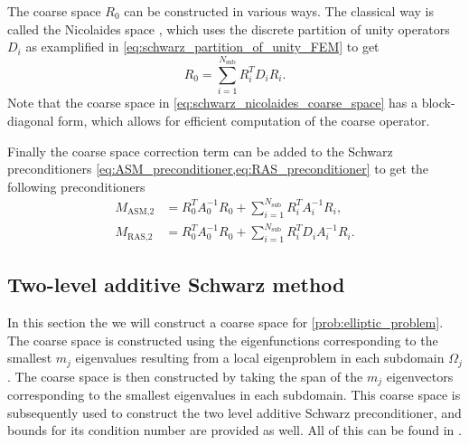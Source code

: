 The coarse space $R_0$ can be constructed in various ways. The classical way is called the Nicolaides space \cite[Section 4.2]{schwarz_methods_Dolean_2015}, which uses the discrete partition of unity operators $D_i$ as examplified in \cref{eq:schwarz_partition_of_unity_FEM} to get
\begin{equation}
  R_0 = \sum_{i=1}^{N_{\text{sub}}} R_i^T D_i R_i.
  \label{eq:schwarz_nicolaides_coarse_space}
\end{equation}
Note that the coarse space in \cref{eq:schwarz_nicolaides_coarse_space} has a block-diagonal form, which allows for efficient computation of the coarse operator.

Finally the coarse space correction term can be added to the Schwarz preconditioners \cref{eq:ASM_preconditioner,eq:RAS_preconditioner} to get the following preconditioners
\begin{subequations}
  \begin{align}
    M_{\text{ASM,2}} & = R_0^T A_0^{-1} R_0 + \sum_{i=1}^{N_{\text{sub}}} R_i^T A_i^{-1} R_i , \label{eq:ASM_preconditioner_coarse}    \\
    M_{\text{RAS,2}} & = R_0^T A_0^{-1} R_0 + \sum_{i=1}^{N_{\text{sub}}} R_i^T D_i A_i^{-1} R_i \label{eq:RAS_preconditioner_coarse}.
  \end{align}
\end{subequations}

\subsection{Two-level additive Schwarz method}\label{sec:two_level_additive_schwarz}
In this section the we will construct a coarse space for \cref{prob:elliptic_problem}. The coarse space is constructed using the eigenfunctions corresponding to the smallest $m_j$ eigenvalues resulting from a local eigenproblem in each subdomain $\Omega_j$. The coarse space is then constructed by taking the span of the $m_j$ eigenvectors corresponding to the smallest eigenvalues in each subdomain. This coarse space is subsequently used to construct the two level additive Schwarz preconditioner, and bounds for its condition number are provided as well.
All of this can be found in \cite[Sections 5.1-5.5]{schwarz_methods_Dolean_2015}.

